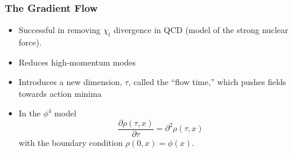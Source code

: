 \documentclass{beamer}
\begin{document}
\begin{frame}
\frametitle{The Gradient Flow}
\begin{itemize}
    \item<1-> Successful in removing $\chi_t$ divergence in QCD (model of the strong nuclear force).
    \item<2-> Reduces high-momentum modes
    \item<3-> Introduces a new dimension, $\tau$, called the ``flow time,'' which pushes fields towards action minima 
    \item<4-> In the $\phi^4$ model
    \begin{equation*}
        \frac{\partial \rho(\tau, x)}{\partial \tau} = \partial^2 \rho(\tau,x)
    \end{equation*}
    with the boundary condition $\rho(0, x)=\phi(x)$.


\end{itemize}
\end{frame}
\end{document}
